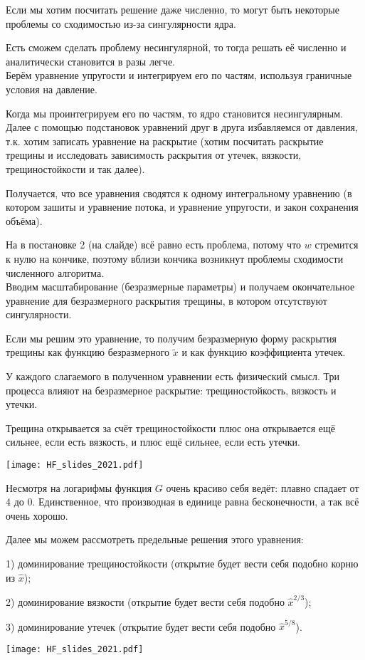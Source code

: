 \documentclass[main.tex]{subfiles}
\begin{document}
Если мы хотим посчитать решение даже численно, то могут быть некоторые проблемы со сходимостью из-за сингулярности ядра.

Есть сможем сделать проблему несингулярной, то тогда решать её численно и аналитически становится в разы легче.
\\

Берём уравнение упругости и интегрируем его по частям, используя граничные условия на давление.

Когда мы проинтегрируем его по частям, то ядро становится несингулярным.
\\

Далее с помощью подстановок уравнений друг в друга избавляемся от давления, т.к. хотим записать уравнение на раскрытие (хотим посчитать раскрытие трещины и исследовать зависимость раскрытия от утечек, вязкости, трещиностойкости и так далее).

Получается, что все уравнения сводятся к одному интегральному уравнению (в котором зашиты и уравнение потока, и уравнение упругости, и закон сохранения объёма).

На в постановке 2 (на слайде) всё равно есть проблема, потому что $w$ стремится к нулю на кончике, поэтому вблизи кончика возникнут проблемы сходимости численного алгоритма.
\\

Вводим масштабирование (безразмерные параметры) и получаем окончательное уравнение для безразмерного раскрытия трещины, в котором отсутствуют сингулярности.

Если мы решим это уравнение, то получим безразмерную форму раскрытия трещины как функцию безразмерного $\tilde{x}$ и как функцию коэффициента утечек.

У каждого слагаемого в полученном уравнении есть физический смысл.
Три процесса влияют на безразмерное раскрытие: трещиностойкость, вязкость и утечки.

Трещина открывается за счёт трещиностойкости плюс она открывается ещё сильнее, если есть вязкость, и плюс ещё сильнее, если есть утечки.

\texttt{[image: HF\_slides\_2021.pdf]}

Несмотря на логарифмы функция $G$ очень красиво себя ведёт: плавно спадает от 4 до 0.
Единственное, что производная в единице равна бесконечности, а так всё очень хорошо.

Далее мы можем рассмотреть предельные решения этого уравнения:

1) доминирование трещиностойкости (открытие будет вести себя подобно корню из $\hat{x}$);

2) доминирование вязкости (открытие будет вести себя подобно $\hat{x}^{2/3}$);

3) доминирование утечек (открытие будет вести себя подобно $\hat{x}^{5/8}$).

\texttt{[image: HF\_slides\_2021.pdf]}
\end{document}
